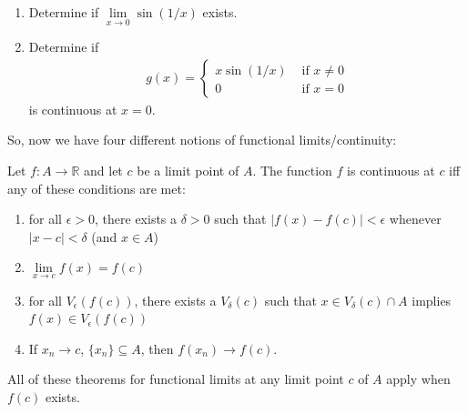 \documentclass{ximera}
\begin{document}
\begin{exercise}
    \begin{enumerate}
        \item Determine if $\lim\limits_{x\to 0}\sin(1/x)$ exists.
        \item Determine if 
        \begin{align*}
            g(x) =
            \begin{cases}
                x\sin(1/x) & \text{ if } x \neq 0
                \\
                0 & \text{ if } x = 0
            \end{cases}
        \end{align*}
        is continuous at $x = 0$.
    \end{enumerate}
\end{exercise}

So, now we have four different notions of functional limits/continuity:

\begin{theorem}
    Let $f:A \to \mathbb{R}$ and let $c$ be a limit point of $A$. The function $f$ is continuous at $c$ iff any of these conditions are met:
    \begin{enumerate}
        \item for all $\epsilon > 0$, there exists a $\delta >0$ such that $|f(x) - f(c)| < \epsilon$ whenever $|x-c|< \delta$ (and $x \in A$)
        \item $\lim\limits_{x\to c} f(x) = f(c)$
        \item for all $V_\epsilon(f(c))$, there exists a $V_\delta(c)$ such that $x \in V_\delta(c)\cap A$ implies $f(x) \in V_\epsilon(f(c))$
        \item If $x_n \to c$, $\{x_n\}\subseteq A$, then $f(x_n) \to f(c)$.
    \end{enumerate}
\end{theorem}

All of these theorems for functional limits at any limit point $c$ of $A$ apply when $f(c)$ exists. 
\end{document}

